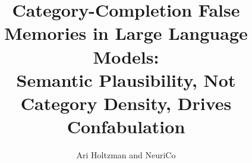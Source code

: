 \documentclass{article}
\title{Category-Completion False Memories in Large Language Models: \\
Semantic Plausibility, Not Category Density, Drives Confabulation}
\author{Ari Holtzman and NeuriCo}
\begin{document}
\maketitle

\begin{abstract}

\end{abstract}










\end{document}
